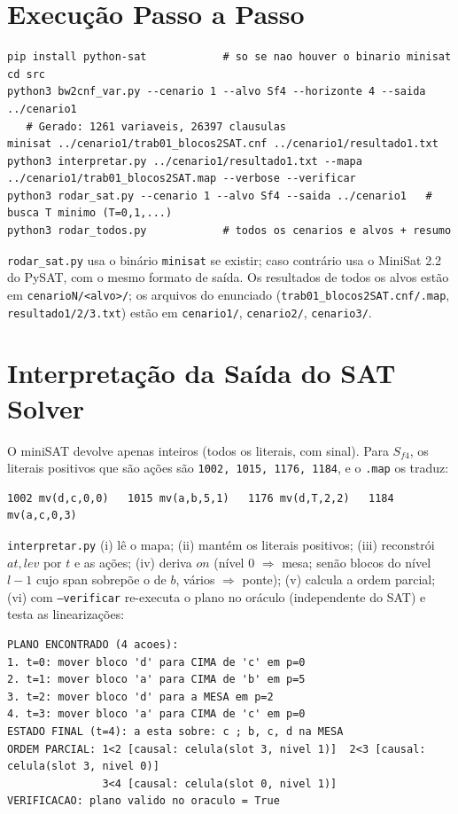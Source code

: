 \documentclass[11pt,a4paper]{article}
\newcommand{\at}{\mathit{at}}\newcommand{\lev}{\mathit{lev}}\newcommand{\clr}{\mathit{clr}}
\begin{document}
\section{Execução Passo a Passo}
\begin{lstlisting}
pip install python-sat            # so se nao houver o binario minisat
cd src
python3 bw2cnf_var.py --cenario 1 --alvo Sf4 --horizonte 4 --saida ../cenario1
   # Gerado: 1261 variaveis, 26397 clausulas
minisat ../cenario1/trab01_blocos2SAT.cnf ../cenario1/resultado1.txt
python3 interpretar.py ../cenario1/resultado1.txt --mapa ../cenario1/trab01_blocos2SAT.map --verbose --verificar
python3 rodar_sat.py --cenario 1 --alvo Sf4 --saida ../cenario1   # busca T minimo (T=0,1,...)
python3 rodar_todos.py            # todos os cenarios e alvos + resumo
\end{lstlisting}
\texttt{rodar\_sat.py} usa o binário \texttt{minisat} se existir; caso contrário usa o MiniSat 2.2 do PySAT, com o mesmo formato de saída.
Os resultados de todos os alvos estão em \texttt{cenarioN/<alvo>/}; os arquivos do enunciado
(\texttt{trab01\_blocos2SAT.cnf/.map}, \texttt{resultado1/2/3.txt}) estão em \texttt{cenario1/}, \texttt{cenario2/}, \texttt{cenario3/}.

\section{Interpretação da Saída do SAT Solver}
O miniSAT devolve apenas inteiros (todos os literais, com sinal). Para $S_{f4}$, os literais positivos que são ações são
\texttt{1002, 1015, 1176, 1184}, e o \texttt{.map} os traduz:
\begin{lstlisting}
1002 mv(d,c,0,0)   1015 mv(a,b,5,1)   1176 mv(d,T,2,2)   1184 mv(a,c,0,3)
\end{lstlisting}
\texttt{interpretar.py} (i) lê o mapa; (ii) mantém os literais positivos; (iii) reconstrói $\at,\lev$ por $t$ e as ações; (iv) deriva
$\mathit{on}$ (nível 0 $\Rightarrow$ mesa; senão blocos do nível $l-1$ cujo span sobrepõe o de $b$, vários $\Rightarrow$ ponte); (v) calcula a ordem parcial; (vi) com \texttt{--verificar}
re-executa o plano no oráculo (independente do SAT) e testa as linearizações:
\begin{lstlisting}
PLANO ENCONTRADO (4 acoes):
1. t=0: mover bloco 'd' para CIMA de 'c' em p=0
2. t=1: mover bloco 'a' para CIMA de 'b' em p=5
3. t=2: mover bloco 'd' para a MESA em p=2
4. t=3: mover bloco 'a' para CIMA de 'c' em p=0
ESTADO FINAL (t=4): a esta sobre: c ; b, c, d na MESA
ORDEM PARCIAL: 1<2 [causal: celula(slot 3, nivel 1)]  2<3 [causal: celula(slot 3, nivel 0)]
               3<4 [causal: celula(slot 0, nivel 1)]
VERIFICACAO: plano valido no oraculo = True
\end{lstlisting}
\end{document}
